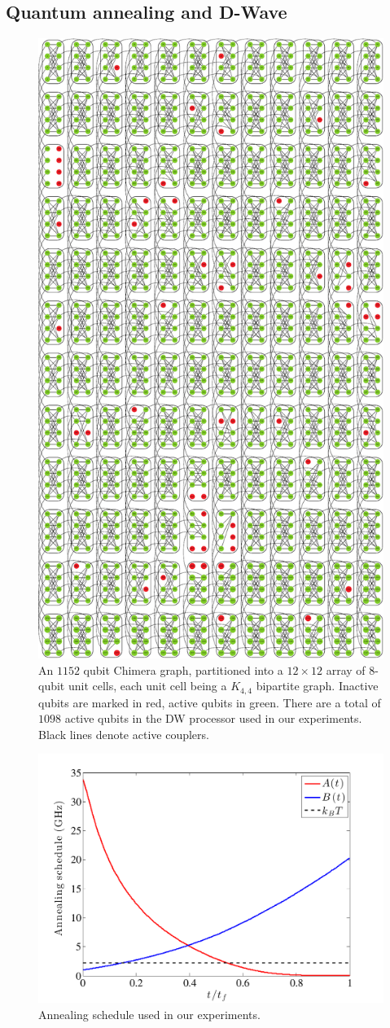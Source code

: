 \subsection{Quantum annealing and D-Wave}
 \begin{figure}[hbt]
 \centering
  \includegraphics[width=.7\columnwidth]{chapters/Higgs/chimera.pdf}
  \caption{An $1152$ qubit Chimera graph, partitioned into a $12\times 12$ array of $8$-qubit unit cells, each unit cell being a $K_{4,4}$ bipartite graph. Inactive qubits are marked in red, active qubits in green. There are a total of $1098$ active qubits in the DW processor used in our experiments. Black lines denote active couplers.}
  \label{fig:chimeraDW2X}
\end{figure}

 \begin{figure}[hbt]
 \centering
  \includegraphics[width=0.7\columnwidth]{chapters/Higgs/AnnealingSchedule}
  \caption{Annealing schedule used in our experiments.}
  \label{fig:annsched}
  \end{figure}

